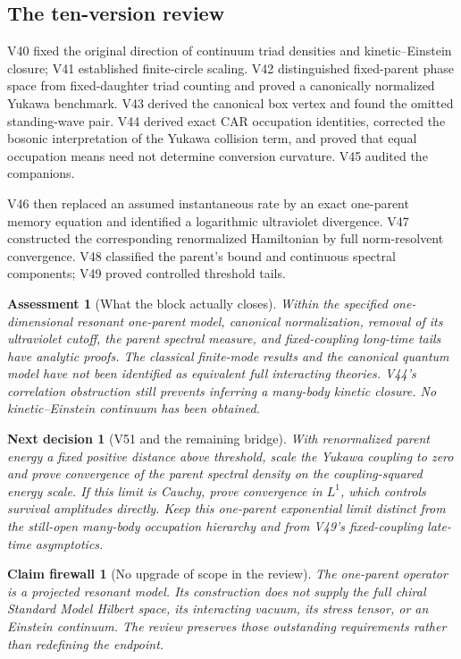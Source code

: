 \documentclass[11pt]{article}
\newtheorem{firewall}[theorem]{Claim firewall}
\newtheorem{decision}[theorem]{Next decision}
\newtheorem{assessment}[theorem]{Assessment}
\theoremstyle{remark}
\begin{document}
\subsection{The ten-version review}

V40 fixed the original direction of continuum triad densities and
kinetic--Einstein closure; V41 established finite-circle scaling.
V42 distinguished fixed-parent phase space from fixed-daughter
triad counting and proved a canonically normalized Yukawa benchmark.
V43 derived the canonical box vertex and found the omitted
standing-wave pair.  V44 derived exact CAR occupation identities,
corrected the bosonic interpretation of the Yukawa collision term,
and proved that equal occupation means need not determine
conversion curvature.  V45 audited the companions.

V46 then replaced an assumed instantaneous rate by an exact
one-parent memory equation and identified a logarithmic
ultraviolet divergence.  V47 constructed the corresponding
renormalized Hamiltonian by full norm-resolvent convergence.
V48 classified the parent's bound and continuous spectral
components; V49 proved controlled threshold tails.

\begin{assessment}[What the block actually closes]
\label{ass:v20v50-sweep}
Within the specified one-dimensional resonant one-parent model,
canonical normalization, removal of its ultraviolet cutoff,
the parent spectral measure, and fixed-coupling long-time
tails have analytic proofs.  The classical finite-mode results
and the canonical quantum model have not been identified as
equivalent full interacting theories.  V44's correlation
obstruction still prevents inferring a many-body kinetic closure.
No kinetic--Einstein continuum has been obtained.
\end{assessment}

\begin{decision}[V51 and the remaining bridge]
\label{dec:v20v50-next}
With renormalized parent energy a fixed positive distance above
threshold, scale the Yukawa coupling to zero and prove convergence
of the parent spectral density on the coupling-squared energy
scale.  If this limit is Cauchy, prove convergence in \(L^1\),
which controls survival amplitudes directly.  Keep this
one-parent exponential limit distinct from the still-open
many-body occupation hierarchy and from V49's fixed-coupling
late-time asymptotics.
\end{decision}

\begin{firewall}[No upgrade of scope in the review]
\label{fire:v20v50}
The one-parent operator is a projected resonant model.  Its
construction does not supply the full chiral Standard Model
Hilbert space, its interacting vacuum, its stress tensor, or
an Einstein continuum.  The review preserves those outstanding
requirements rather than redefining the endpoint.
\end{firewall}
\end{document}

